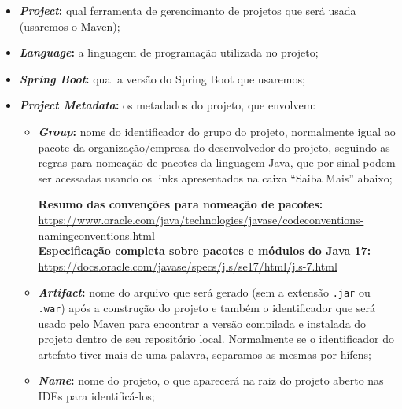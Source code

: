 \begin{itemize}

    \item \textbf{\textit{Project}:} qual ferramenta de gerencimanto de projetos que será usada (usaremos o Maven);
    
    \item \textbf{\textit{Language}:} a linguagem de programação utilizada no projeto;
    
    \item \textbf{\textit{Spring Boot}:} qual a versão do Spring Boot que usaremos;
    
    \item \textbf{\textit{Project Metadata}:} os metadados do projeto, que envolvem:
    
    \begin{itemize}
    
        \item \textbf{\textit{Group}:} nome do identificador do grupo do projeto, normalmente igual ao pacote da organização/empresa do desenvolvedor do projeto, seguindo as regras para nomeação de pacotes da linguagem Java, que por sinal podem ser acessadas usando os links apresentados na caixa ``Saiba Mais'' abaixo;
        
        \begin{saibaMais}
            \textbf{Resumo das convenções para nomeação de pacotes:}\\
            \url{https://www.oracle.com/java/technologies/javase/codeconventions-namingconventions.html}\\
            \textbf{Especificação completa sobre pacotes e módulos do Java 17:}\\
            \url{https://docs.oracle.com/javase/specs/jls/se17/html/jls-7.html}
        \end{saibaMais}
        
        \item \textbf{\textit{Artifact}:} nome do arquivo que será gerado (sem a extensão \texttt{.jar} ou \texttt{.war}) após a construção do projeto e também o identificador que será usado pelo Maven para encontrar a versão compilada e instalada do projeto dentro de seu repositório local. Normalmente se o identificador do artefato tiver mais de uma palavra, separamos as mesmas por hífens;
        
        \item \textbf{\textit{Name}:} nome do projeto, o que aparecerá na raiz do projeto aberto nas IDEs para identificá-los;
        

\end{itemize}
\end{itemize}
